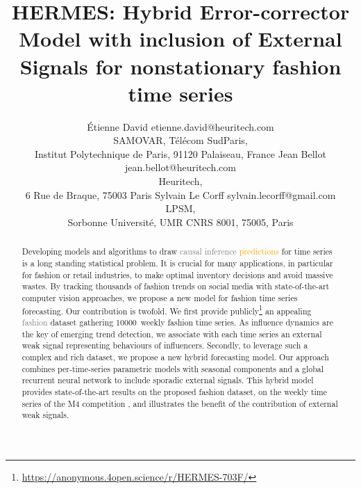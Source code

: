\documentclass[10pt]{article} %
\title{HERMES: Hybrid Error-corrector Model with inclusion of External Signals for nonstationary fashion time series}
\author{\name \'Etienne David \email etienne.david@heuritech.com \\
      \addr SAMOVAR, Télécom SudParis,\\
      Institut Polytechnique de Paris, 91120 Palaiseau, France
      \AND
      \name Jean Bellot \email jean.bellot@heuritech.com \\
      \addr Heuritech, \\
      6 Rue de Braque, 75003 Paris
      \AND
      \name Sylvain Le Corff \email sylvain.lecorff@gmail.com\\
      \addr LPSM, \\
      Sorbonne Université, UMR CNRS 8001, 75005, Paris
      }
\newcommand{\numberts}{10000}
\begin{document}
\maketitle

\begin{abstract}
Developing models and algorithms to draw \textcolor{gray}{causal inference} \textcolor{orange}{predictions} for time series is a long standing statistical problem. It is crucial for many applications, in particular for fashion or retail industries, to make optimal inventory decisions and avoid massive wastes. By tracking thousands of fashion trends on social media with state-of-the-art computer vision approaches, we propose a new model for fashion time series forecasting. Our contribution is  twofold. We first provide publicly\footnote[1]{\url{https://anonymous.4open.science/r/HERMES-703F/}} an appealing \textcolor{gray}{fashion} dataset gathering \numberts\ weekly fashion time series. As influence dynamics are the key of emerging trend detection, we associate with each time series an external weak signal representing behaviours of influencers. Secondly, to leverage such a complex and rich dataset, we propose a new hybrid forecasting model\footnotemark. Our approach combines per-time-series parametric models with seasonal components and a global recurrent neural network to include sporadic external signals. This hybrid model provides state-of-the-art results on the proposed fashion dataset, on the weekly time series of the M4 competition \citep{makridakis2018}, and illustrates the benefit of the contribution of external weak signals.
\end{abstract}
\end{document}
